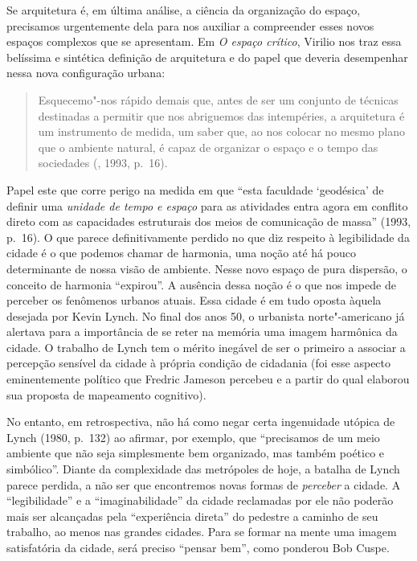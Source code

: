 Se arquitetura é, em última análise, a ciência da organização do espaço,
precisamos urgentemente dela para nos auxiliar a compreender esses novos
espaços complexos que se apresentam. Em \emph{O espaço crítico}, Virilio
nos traz essa belíssima e sintética definição de arquitetura e
do papel que deveria desempenhar nessa nova configuração urbana:

\begin{quote}
Esquecemo"-nos rápido demais que, antes de ser um conjunto de técnicas
destinadas a permitir que nos abriguemos das intempéries, a arquitetura
é um instrumento de medida, um saber que, ao nos colocar no mesmo plano
que o ambiente natural, é capaz de organizar o espaço e o tempo das
sociedades (, 1993, p.~16).
\end{quote}

Papel este que corre perigo na medida em que ``esta faculdade
`geodésica' de definir uma \emph{unidade de tempo e espaço} para as
atividades entra agora em conflito direto com as capacidades estruturais
dos meios de comunicação de massa'' (1993, p.~16). O que parece
definitivamente perdido no que diz respeito à legibilidade da cidade é o
que podemos chamar de harmonia, uma noção até há pouco determinante de
nossa visão de ambiente. Nesse novo espaço de pura dispersão, o conceito
de harmonia ``expirou''. A ausência dessa noção é o que nos impede de
perceber os fenômenos urbanos atuais. Essa cidade é em tudo oposta
àquela desejada por Kevin Lynch. No final dos anos 50, o urbanista
norte"-americano já alertava para a importância de se reter na memória
uma imagem harmônica da cidade. O trabalho de Lynch tem o mérito
inegável de ser o primeiro a associar a percepção sensível da cidade à
própria condição de cidadania (foi esse aspecto eminentemente político
que Fredric Jameson percebeu e a partir do qual elaborou sua proposta de
mapeamento cognitivo).

No entanto, em retrospectiva, não há como negar certa ingenuidade
utópica de Lynch (1980, p.~132) ao afirmar, por exemplo, que ``precisamos de um meio
ambiente que não seja simplesmente bem organizado, mas também poético e
simbólico''. Diante da complexidade das metrópoles de
hoje, a batalha de Lynch parece perdida, a não ser que encontremos novas
formas de \emph{perceber} a cidade. A ``legibilidade'' e a
``imaginabilidade'' da cidade reclamadas por ele não poderão mais ser
alcançadas pela ``experiência direta'' do pedestre a caminho de seu
trabalho, ao menos nas grandes cidades. Para se formar na mente uma
imagem satisfatória da cidade, será preciso ``pensar bem'', como
ponderou Bob Cuspe.

